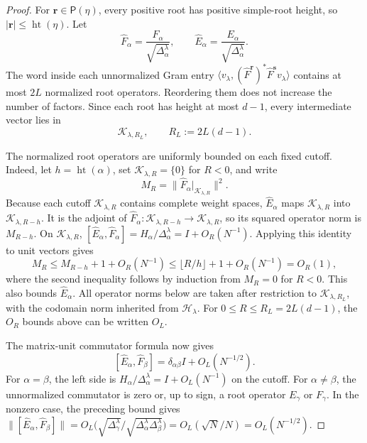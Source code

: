 \documentclass[11pt]{article}
\theoremstyle{remark}
\theoremstyle{plain}
\newcommand{\cH}{\mathcal H}
\begin{document}
\begin{proof}
For \(\mathbf r\in\mathsf P(\eta)\), every positive root has positive
simple-root height, so
\(|\mathbf r|\le\operatorname{ht}(\eta)\).  Let
\[
  \widehat F_\alpha=\frac{F_\alpha}{\sqrt{\Delta_\alpha^\lambda}},
  \qquad
  \widehat E_\alpha=\frac{E_\alpha}{\sqrt{\Delta_\alpha^\lambda}}.
\]
The word inside each unnormalized Gram entry
\(\langle v_\lambda,(\widehat F^{\mathbf r})^*
\widehat F^{\mathbf s}v_\lambda\rangle\) contains at most \(2L\)
normalized root operators.  Reordering them does not increase the number
of factors.  Since each root has height at most \(d-1\), every
intermediate vector lies in
\[
  \mathcal K_{\lambda,R_L},
  \qquad R_L:=2L(d-1).
\]

The normalized root operators are uniformly bounded on each fixed
cutoff.  Indeed, let \(h=\operatorname{ht}(\alpha)\), set
\(\mathcal K_{\lambda,R}=\{0\}\) for \(R<0\), and write
\[
  M_R=\bigl\|\widehat F_\alpha|_{\mathcal K_{\lambda,R}}\bigr\|^2.
\]
Because each cutoff \(\mathcal K_{\lambda,R}\)
contains complete weight spaces, \(\widehat E_\alpha\) maps
\(\mathcal K_{\lambda,R}\) into
\(\mathcal K_{\lambda,R-h}\).  It is the adjoint of
\(\widehat F_\alpha:\mathcal K_{\lambda,R-h}\to
\mathcal K_{\lambda,R}\), so its squared operator norm is \(M_{R-h}\).
On \(\mathcal K_{\lambda,R}\),
\([\widehat E_\alpha,\widehat F_\alpha]
=H_\alpha/\Delta_\alpha^\lambda=I+O_R(N^{-1})\).  Applying this identity
to unit vectors gives
\[
  M_R\le M_{R-h}+1+O_R(N^{-1})
  \le \lfloor R/h\rfloor+1+O_R(N^{-1})=O_R(1),
\]
where the second inequality follows by induction from \(M_R=0\) for
\(R<0\).  This also bounds \(\widehat E_\alpha\).  All operator norms below
are taken after restriction to
\(\mathcal K_{\lambda,R_L}\), with the codomain norm inherited from
\(\cH_\lambda\).  For \(0\le R\le R_L=2L(d-1)\),
the \(O_R\) bounds above can be written \(O_L\).

The matrix-unit commutator formula now gives
\begin{equation}\label{eq:normalized-root-commutator}
  [\widehat E_\alpha,\widehat F_\beta]
  =\delta_{\alpha\beta}I+O_L(N^{-1/2}).
\end{equation}
For \(\alpha=\beta\), the left side is
\(H_\alpha/\Delta_\alpha^\lambda=I+O_L(N^{-1})\) on the cutoff.
For \(\alpha\ne\beta\), the unnormalized commutator is zero or,
up to sign, a root operator \(E_\gamma\) or \(F_\gamma\).  In the nonzero
case, the preceding bound gives
\(\|[\widehat E_\alpha,\widehat F_\beta]\|
=O_L\bigl(\sqrt{\Delta_\gamma^\lambda}/
\sqrt{\Delta_\alpha^\lambda\Delta_\beta^\lambda}\bigr)
=O_L(\sqrt N/N)=O_L(N^{-1/2})\).


\end{proof}
\end{document}
